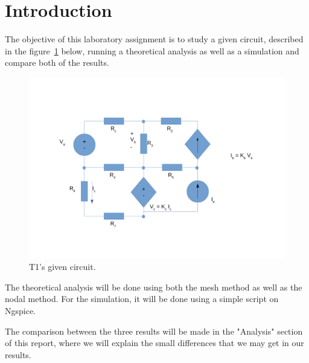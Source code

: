 \section{Introduction}
\label{sec:introduction}

The objective of this laboratory assignment is to study a given circuit, described in the figure~\ref{fig:circuito} below, running a theoretical analysis as well as a simulation and compare both of the results.

\begin{figure}[H] \centering
\includegraphics[width=0.7\linewidth]{circuito.pdf}
\caption{T1's given circuit.}
\label{fig:circuito}
\end{figure}

The theoretical analysis will be done using both the mesh method as well as the nodal method. For the simulation, it will be done using a simple script on Ngspice. \par
The comparison between the three results will be made in the "Analysis" section of this report, where we will explain the small differences that we may get in our results.


